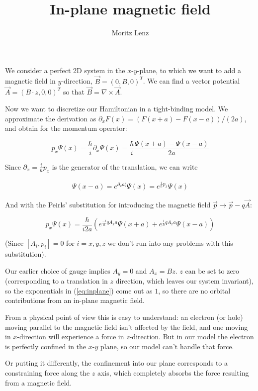 \documentclass[11pt]{article}
\author{Moritz Lenz}
\title{In-plane magnetic field}
\newcommand{\inp}[1]{\ensuremath{\left(#1\right)}}
\newcommand{\dell}{\partial}
\begin{document}
\maketitle

We consider a perfect 2D system in the $x$-$y$-plane, to which we want to add
a magnetic field in $y$-direction, $\vec B = (0, B, 0)^T$. We can find 
a vector potential $\vec A = (B \cdot z, 0, 0)^T$ so that $\vec B = \nabla
\times \vec A$.

Now we want to discretize our Hamiltonian in a tight-binding model. We
approximate the derivation as $\dell_x F(x) = (F(x+a)-F(x-a))/(2a)$, and
obtain for the momentum operator:

\begin{equation}
    p_x \Psi(x) = \frac{\hbar}{i} \dell_x \Psi(x)=  \frac{\hbar}{i} \frac{\Psi(x+a) -
        \Psi(x-a)}{2a}
\end{equation}

Since $\dell_x = \frac{i}{\hbar} p_x$ is the generator of the translation, we can write

\begin{align}
    \Psi(x-a)   = e^{\dell_x a)} \Psi(x)  = e^{\frac{i}{\hbar} p_x} \Psi(x) 
\end{align}

And with the Peirls' substitution for introducing the magnetic field $\vec p
\rightarrow \vec p - q \vec A$:

\begin{equation} \label{eq:inplane}
    p_x \Psi(x) = \frac{\hbar}{i 2a} \inp{
          e^{\frac{-i}{\hbar} q A_x a} \Psi(x+a)
        + e^{\frac{ i}{\hbar} q A_x a} \Psi(x-a)
    } 
\end{equation}

(Since $[A_i, p_i] = 0$ for $i = x, y, z$ we don't run into any problems
 with this substitution).

Our earlier choice of gauge implies $A_y = 0$ and $A_x = B z$. $z$ can be set
to zero (corresponding to a translation in $z$ direction, which leaves our
system invariant), so the exponentials in (\ref{eq:inplane}) come out as $1$,
so there are no orbital contributions from an in-plane magnetic field.

From a physical point of view this is easy to understand: an electron (or
hole) moving parallel to the magnetic field isn't affected by the field, and
one moving in $x$-direction will experience a force in $z$-direction. But in
our model the electron is perfectly confined in the $x$-$y$ plane, so our
model can't handle that force.

Or putting it differently, the confinement into our plane corresponds to a
constraining force along the $z$ axis, which completely absorbs the force
resulting from a magnetic field.
\end{document}

